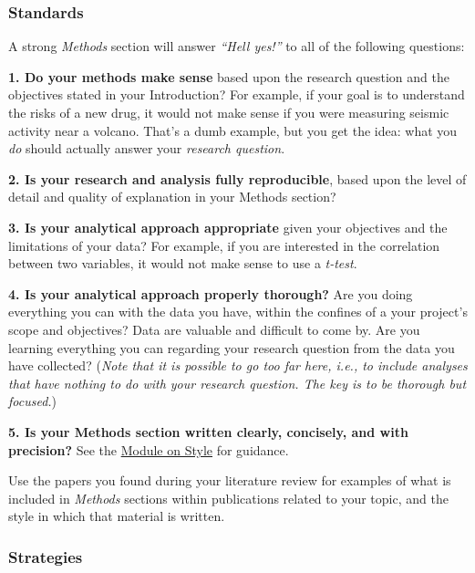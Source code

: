 \documentclass[
]{book}
\begin{document}
\hypertarget{standards-2}{%
\subsubsection*{Standards}\label{standards-2}}

A strong \emph{Methods} section will answer \emph{``Hell yes!''} to all of the following questions:

\textbf{1. Do your methods make sense} based upon the research question and the objectives stated in your Introduction? For example, if your goal is to understand the risks of a new drug, it would not make sense if you were measuring seismic activity near a volcano. That's a dumb example, but you get the idea: what you \emph{do} should actually answer your \emph{research question}.

\textbf{2. Is your research and analysis fully reproducible}, based upon the level of detail and quality of explanation in your Methods section?

\textbf{3. Is your analytical approach appropriate} given your objectives and the limitations of your data? For example, if you are interested in the correlation between two variables, it would not make sense to use a \emph{t-test}.

\textbf{4. Is your analytical approach properly thorough?} Are you doing everything you can with the data you have, within the confines of a your project's scope and objectives? Data are valuable and difficult to come by. Are you learning everything you can regarding your research question from the data you have collected? (\emph{Note that it is possible to go too far here, i.e., to include analyses that have nothing to do with your research question. The key is to be thorough but focused.})

\textbf{5. Is your Methods section written clearly, concisely, and with precision?} See the \protect\hyperlink{style}{Module on Style} for guidance.

Use the papers you found during your literature review for examples of what is included in \emph{Methods} sections within publications related to your topic, and the style in which that material is written.

\hypertarget{strategies-2}{%
\subsubsection*{Strategies}\label{strategies-2}}
\end{document}
